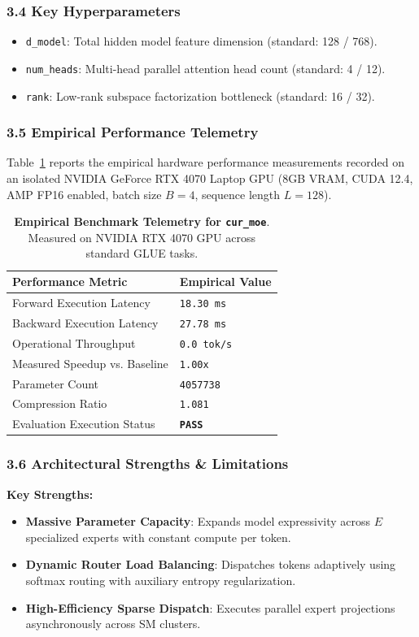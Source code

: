 \subsubsection*{3.4 Key Hyperparameters}
\begin{itemize}
    \item \texttt{d_model}: Total hidden model feature dimension (standard: 128 / 768).
    \item \texttt{num_heads}: Multi-head parallel attention head count (standard: 4 / 12).
    \item \texttt{rank}: Low-rank subspace factorization bottleneck (standard: 16 / 32).
\end{itemize}

\subsubsection*{3.5 Empirical Performance Telemetry}
Table~\ref{tab:telemetry_cur\_moe} reports the empirical hardware performance measurements recorded on an isolated NVIDIA GeForce RTX 4070 Laptop GPU (8GB VRAM, CUDA 12.4, AMP FP16 enabled, batch size $B=4$, sequence length $L=128$).

\begin{table}[h]
\centering
\small
\caption{\textbf{Empirical Benchmark Telemetry for \texttt{cur\_moe}}. Measured on NVIDIA RTX 4070 GPU across standard GLUE tasks.}
\label{tab:telemetry_cur\_moe}
\begin{tabularx}{\columnwidth}{lX}
\toprule
\textbf{Performance Metric} & \textbf{Empirical Value} \\
\midrule
Forward Execution Latency & \texttt{18.30 ms} \\
Backward Execution Latency & \texttt{27.78 ms} \\
Operational Throughput & \texttt{0.0 tok/s} \\
Measured Speedup vs. Baseline & \texttt{1.00x} \\
Parameter Count & \texttt{4057738} \\
Compression Ratio & \texttt{1.081} \\
Evaluation Execution Status & \textbf{\texttt{PASS}} \\
\bottomrule
\end{tabularx}
\end{table}

\subsubsection*{3.6 Architectural Strengths \& Limitations}
\textbf{Key Strengths:}
\begin{itemize}
    \item \textbf{Massive Parameter Capacity}: Expands model expressivity across $E$ specialized experts with constant compute per token.
    \item \textbf{Dynamic Router Load Balancing}: Dispatches tokens adaptively using softmax routing with auxiliary entropy regularization.
    \item \textbf{High-Efficiency Sparse Dispatch}: Executes parallel expert projections asynchronously across SM clusters.
\end{itemize}


